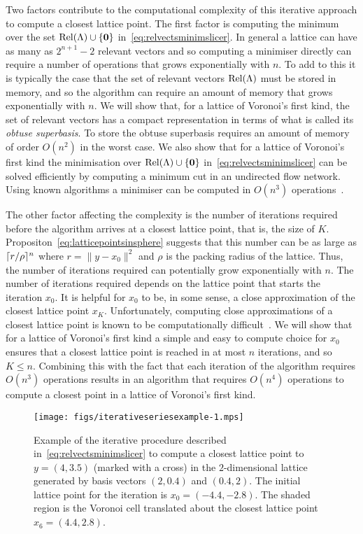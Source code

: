 \documentclass[final,leqno]{siamltex}
\begin{document}
Two factors contribute to the computational complexity of this iterative approach to compute a closest lattice point.  The first factor is computing the minimum over the set $\operatorname{Rel}(\Lambda) \cup \{\boldsymbol{0}\}$ in~\eqref{eq:relvectsminimslicer}.  In general a lattice can have as many as $2^{n+1}-2$ relevant vectors and so computing a minimiser directly can require a number of operations that grows exponentially with $n$.  To add to this it is typically the case that the set of relevant vectors $\operatorname{Rel}(\Lambda)$ must be stored in memory, and so the algorithm can require an amount of memory that grows exponentially with $n$.  We will show that, for a lattice of Voronoi's first kind, the set of relevant vectors has a compact representation in terms of what is called its \emph{obtuse superbasis}.  To store the obtuse superbasis requires an amount of memory of order $O(n^2)$ in the worst case.  We also show that for a lattice of Voronoi's first kind the minimisation over $\operatorname{Rel}(\Lambda) \cup \{\boldsymbol{0}\}$ in~\eqref{eq:relvectsminimslicer} can be solved efficiently by computing a minimum cut in an undirected flow network.  Using known algorithms a minimiser can be computed in $O(n^3)$ operations~\cite{Goldberg:1986:NAM:12130.12144,EdmondsKarp_max_flow,Cormen2001}. 

The other factor affecting the complexity is the number of iterations required before the algorithm arrives at a closest lattice point, that is, the size of $K$.  Propositon~\ref{eq:latticepointsinsphere} suggests that this number can be as large as $\lceil r/\rho \rceil^n$ where $r = \|y - x_0\|^2$ and $\rho$ is the packing radius of the lattice.  Thus, the number of iterations required can potentially grow exponentially with $n$.  The number of iterations required depends on the lattice point that starts the iteration $x_0$.  It is helpful for $x_0$ to be, in some sense, a close approximation of the closest lattice point $x_K$.  Unfortunately, computing close approximations of a closest lattice point is known to be computationally difficult~\cite{feige_inapproximability_2004}.  We will show that for a lattice of Voronoi's first kind a simple and easy to compute choice for $x_0$ ensures that a closest lattice point is reached in at most $n$ iterations, and so $K \leq n$.  Combining this with the fact that each iteration of the algorithm requires $O(n^3)$ operations results in an algorithm that requires $O(n^4)$ operations to compute a closest point in a lattice of Voronoi's first kind. 


\begin{figure}[tp] 
	\centering      
		\texttt{[image: figs/iterativeseriesexample-1.mps]} 
		\caption{Example of the iterative procedure described in~\eqref{eq:relvectsminimslicer} to compute a closest lattice point to $y = (4,3.5)$ (marked with a cross) in the $2$-dimensional lattice generated by basis vectors $(2,0.4)$ and $(0.4,2)$.  The initial lattice point for the iteration is $x_0 = (-4.4,-2.8)$.  The shaded region is the Voronoi cell translated about the closest lattice point $x_6 = (4.4,2.8)$.}       
		\label{lattices:fig:iterativeexample} 
\end{figure} 
\end{document}
